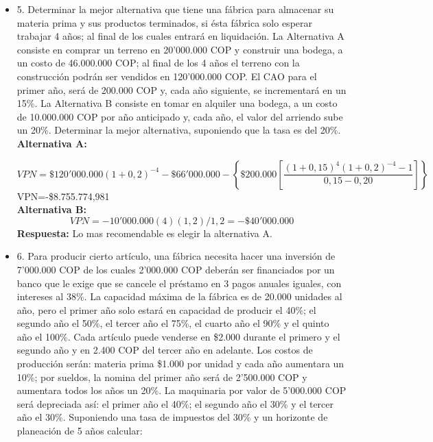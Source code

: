 \begin{itemize}
       \medskip

 \item 5. Determinar la mejor alternativa que tiene una fábrica para almacenar su materia prima y sus productos terminados, si ésta fábrica solo esperar trabajar 4 años; al final de los cuales entrará en liquidación. La Alternativa A consiste en comprar un terreno en 20'000.000 COP y construir una bodega, a un costo de 46.000.000 COP; al final de los 4 años el terreno con la construcción podrán ser vendidos en 120'000.000 COP. El CAO para el primer año, será de 200.000 COP y, cada año siguiente, se incrementará en un 15\%. La Alternativa B consiste en tomar en alquiler una bodega, a un costo de 10.000.000 COP por año anticipado y, cada año, el valor del arriendo sube un 20\%. Determinar la mejor alternativa, suponiendo que la tasa es del 20\%. \\

       \textbf{Alternativa A:}
   
       \[ VPN=\$120'000.000\left(1+0,2\right)^{-4}-\$66'000.000-\left\{\$200.000\left[\frac{\left(1+0,15\right)^4\left(1+0,2\right)^{-4}-1}{0,15-0,20}\right]\right\} \]
       VPN=-\$8.755.774,981
       \\
       \textbf{Alternativa B:}\\
        \[ VPN=-10'000.000\left(4\right)\left(1,2\right)/1,2=-\$40'000.000 \]
       \textbf{Respuesta:} Lo mas recomendable es elegir la alternativa A.
       \medskip

 \item 6. Para producir cierto artículo, una fábrica necesita hacer una inversión de 7'000.000 COP de los cuales 2'000.000 COP deberán ser financiados por un banco que le exige que se cancele el préstamo en 3 pagos anuales iguales, con intereses al 38\%. La capacidad máxima de la fábrica es de 20.000 unidades al año, pero el primer año solo estará en capacidad de producir el 40\%; el segundo año el 50\%, el tercer año el 75\%, el cuarto año el 90\% y el quinto año el 100\%. Cada artículo puede venderse en \$2.000 durante el primero y el segundo año y en 2.400 COP del tercer año en adelante. Los costos de producción serán: materia prima \$1.000 por unidad y cada año aumentara un 10\%; por sueldos, la nomina del primer año será de 2'500.000 COP y aumentara todos los años un 20\%. La maquinaria por valor de 5'000.000 COP será depreciada así: el primer año el 40\%; el segundo año el 30\% y el tercer año el 30\%. Suponiendo una tasa de impuestos del 30\% y un horizonte de planeación de 5 años calcular: \\


\end{itemize}
